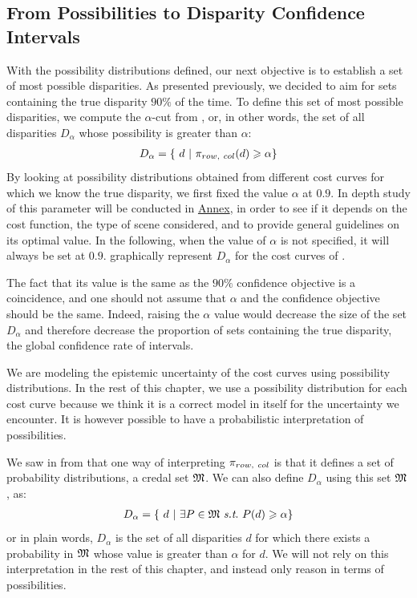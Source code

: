 \subsection{From Possibilities to Disparity Confidence Intervals}
With the possibility distributions defined, our next objective is to establish a set of most possible disparities. As presented previously, we decided to aim for sets containing the true disparity $90\%$ of the time. To define this set of most possible disparities, we compute the $\alpha$-cut from , or, in other words, the set of all disparities $D_\alpha$ whose possibility is greater than $\alpha$:
\begin{align}
    D_\alpha=\{~ d ~|~ \pi_{row, ~col}(d)\geqslant\alpha\}\label{eq:set_of_possible_disparities}
\end{align}
By looking at possibility distributions obtained from different cost curves for which we know the true disparity, we first fixed the value $\alpha$ at $0.9$. In depth study of this parameter will be conducted in \hyperref[chap:annex]{Annex}, in order to see if it depends on the cost function, the type of scene considered, and to provide general guidelines on its optimal value. In the following, when the value of $\alpha$ is not specified, it will always be set at $0.9$.  graphically represent $D_\alpha$ for the cost curves of .


\begin{remark}
    The fact that its value is the same as the $90\%$ confidence objective is a coincidence, and one should not assume that $\alpha$ and the confidence objective should be the same. Indeed, raising the $\alpha$ value would decrease the size of the set $D_\alpha$ and therefore decrease the proportion of sets containing the true disparity, \ie the global confidence rate of intervals.
\end{remark}

\begin{remark}
    We are modeling the epistemic uncertainty of the cost curves using possibility distributions. In the rest of this chapter, we use a possibility distribution for each cost curve because we think it is a correct model in itself for the uncertainty we encounter. It is however possible to have a probabilistic interpretation of possibilities.
    
    We saw in  from  that one way of interpreting $\pi_{row, ~col}$ is that it defines a set of probability distributions, \ie a credal set $\mathfrak{M}$. We can also define $D_\alpha$ using this set $\mathfrak{M}$, as:
    \begin{align}
        D_\alpha=\{~ d ~|~ \exists P\in\M ~\st~ P(d)\geqslant \alpha\}
    \end{align}
    or in plain words, $D_\alpha$ is the set of all disparities $d$ for which there exists a probability in $\mathfrak{M}$ whose value is greater than $\alpha$ for $d$. We will not rely on this interpretation in the rest of this chapter, and instead only reason in terms of possibilities.
\end{remark}

